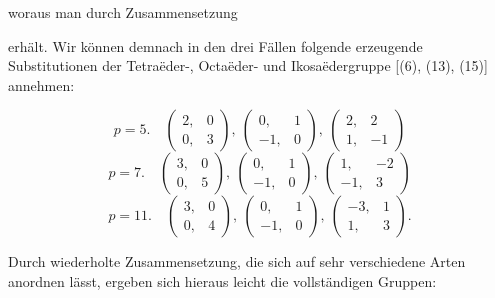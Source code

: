 
woraus man durch Zusammensetzung


erhält. Wir können demnach in den drei Fällen folgende erzeugende Substitutionen der Tetra\"eder-, Octa\"eder- und Ikosa\"edergruppe [(6), (13), (15)] annehmen:

\[
p = 5. \quad \begin{pmatrix} 2, & 0 \\ 0, & 3 \end{pmatrix}, \ \begin{pmatrix} 0, & 1 \\ -1, & 0 \end{pmatrix}, \ \begin{pmatrix} 2, & 2 \\ 1, & -1 \end{pmatrix}
\]
\[
p = 7. \quad \begin{pmatrix} 3, & 0 \\ 0, & 5 \end{pmatrix}, \ \begin{pmatrix} 0, & 1 \\ -1, & 0 \end{pmatrix}, \ \begin{pmatrix} 1, & -2 \\ -1, & 3 \end{pmatrix}
\]
\[
p = 11. \quad \begin{pmatrix} 3, & 0 \\ 0, & 4 \end{pmatrix}, \ \begin{pmatrix} 0, & 1 \\ -1, & 0 \end{pmatrix}, \ \begin{pmatrix} -3, & 1 \\ 1, & 3 \end{pmatrix}.
\]

Durch wiederholte Zusammensetzung, die sich auf sehr verschiedene Arten anordnen lässt, ergeben sich hieraus leicht die vollständigen Gruppen:

